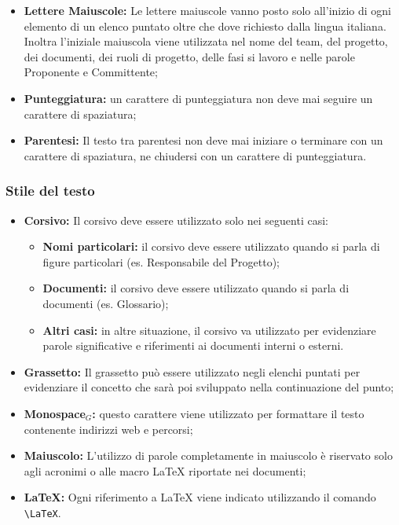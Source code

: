 \begin{itemize}
\item \textbf{Lettere Maiuscole:} Le lettere maiuscole vanno posto solo  all'inizio di ogni elemento di un elenco puntato oltre che dove richiesto dalla lingua italiana. Inoltra l'iniziale maiuscola viene utilizzata nel nome del team, del progetto, dei documenti, dei ruoli di progetto, delle fasi si lavoro e nelle parole Proponente e Committente;
\item \textbf{Punteggiatura:} un carattere di punteggiatura non deve mai seguire un carattere di spaziatura;
\item \textbf{Parentesi:} Il testo tra parentesi non deve mai iniziare o terminare con un carattere di spaziatura, ne chiudersi con un carattere di punteggiatura.
\end{itemize}

\subsubsection{Stile del testo}

\begin{itemize}
\item \textbf{Corsivo:} Il corsivo deve essere utilizzato solo nei seguenti casi:
\begin{itemize}
\item \textbf{Nomi particolari:} il corsivo deve essere utilizzato quando si parla di figure particolari (es. Responsabile del Progetto);
\item \textbf{Documenti:} il corsivo deve essere utilizzato quando si parla di documenti (es. Glossario);
\item \textbf{Altri casi:} in altre situazione, il corsivo va utilizzato per evidenziare parole significative e riferimenti ai documenti interni o esterni.
\end{itemize} 
\item \textbf{Grassetto:} Il grassetto può essere utilizzato negli elenchi puntati per evidenziare il concetto che sarà poi sviluppato nella continuazione del punto;
\item \textbf{Monospace$_{G}$:} questo carattere viene utilizzato per formattare il testo contenente indirizzi web e percorsi;
\item \textbf{Maiuscolo:} L'utilizzo di parole completamente in maiuscolo è riservato solo agli acronimi o alle macro \LaTeX{} riportate nei documenti;
\item \textbf{\LaTeX:} Ogni riferimento a \LaTeX{} viene indicato utilizzando il comando \verb|\LaTeX|.
\end{itemize}

